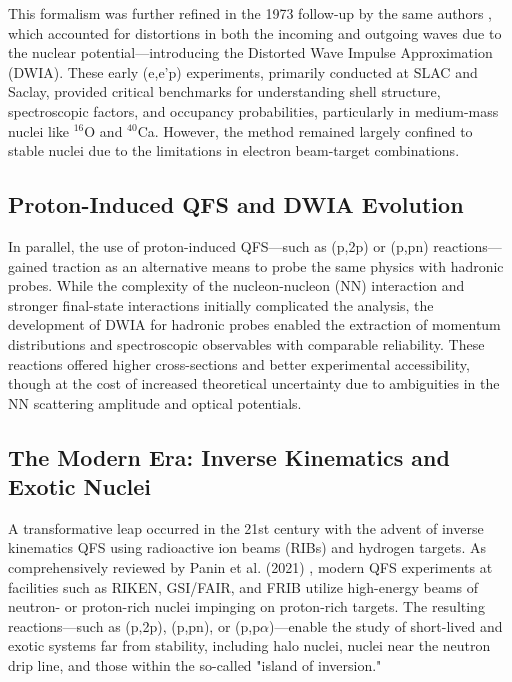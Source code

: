 This formalism was further refined in the 1973 follow-up by the same authors \cite{jacob_quasi-free_1973}, which accounted for distortions in both the incoming and outgoing waves due to the nuclear potential—introducing the Distorted Wave Impulse Approximation (DWIA). These early (e,e'p) experiments, primarily conducted at SLAC and Saclay, provided critical benchmarks for understanding shell structure, spectroscopic factors, and occupancy probabilities, particularly in medium-mass nuclei like $^{16}$O and $^{40}$Ca. However, the method remained largely confined to stable nuclei due to the limitations in electron beam-target combinations.


\subsection{Proton-Induced QFS and DWIA Evolution}

In parallel, the use of proton-induced \gls{QFS}—such as (p,2p) or (p,pn) reactions—gained traction as an alternative means to probe the same physics with hadronic probes. While the complexity of the nucleon-nucleon (NN) interaction and stronger final-state interactions initially complicated the analysis, the development of DWIA for hadronic probes enabled the extraction of momentum distributions and spectroscopic observables with comparable reliability. These reactions offered higher cross-sections and better experimental accessibility, though at the cost of increased theoretical uncertainty due to ambiguities in the NN scattering amplitude and optical potentials.

\subsection{The Modern Era: Inverse Kinematics and Exotic Nuclei}

A transformative leap occurred in the 21st century with the advent of inverse kinematics \gls{QFS} using radioactive ion beams (RIBs) and hydrogen targets. As comprehensively reviewed by Panin et al. (2021) \cite{panin_quasi-free_2021}, modern \gls{QFS} experiments at facilities such as RIKEN, GSI/FAIR, and FRIB utilize high-energy beams of neutron- or proton-rich nuclei impinging on proton-rich targets. The resulting reactions—such as (p,2p), (p,pn), or (p,p$\alpha$)—enable the study of short-lived and exotic systems far from stability, including halo nuclei, nuclei near the neutron drip line, and those within the so-called "island of inversion."

